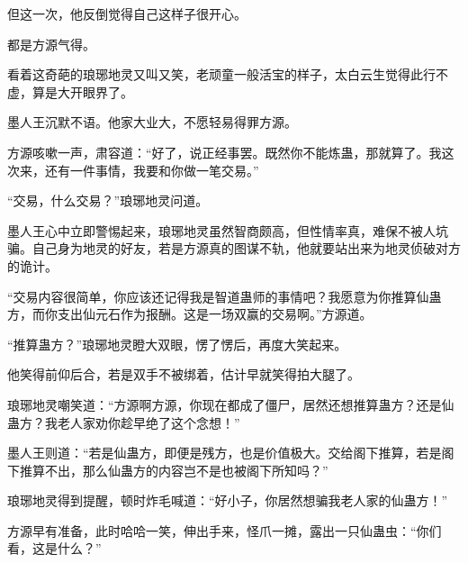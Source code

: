 \begin{this_body}
但这一次，他反倒觉得自己这样子很开心。

都是方源气得。

看着这奇葩的琅琊地灵又叫又笑，老顽童一般活宝的样子，太白云生觉得此行不虚，算是大开眼界了。

墨人王沉默不语。他家大业大，不愿轻易得罪方源。

方源咳嗽一声，肃容道：“好了，说正经事罢。既然你不能炼蛊，那就算了。我这次来，还有一件事情，我要和你做一笔交易。”

“交易，什么交易？”琅琊地灵问道。

墨人王心中立即警惕起来，琅琊地灵虽然智商颇高，但性情率真，难保不被人坑骗。自己身为地灵的好友，若是方源真的图谋不轨，他就要站出来为地灵侦破对方的诡计。

“交易内容很简单，你应该还记得我是智道蛊师的事情吧？我愿意为你推算仙蛊方，而你支出仙元石作为报酬。这是一场双赢的交易啊。”方源道。

“推算蛊方？”琅琊地灵瞪大双眼，愣了愣后，再度大笑起来。

他笑得前仰后合，若是双手不被绑着，估计早就笑得拍大腿了。

琅琊地灵嘲笑道：“方源啊方源，你现在都成了僵尸，居然还想推算蛊方？还是仙蛊方？我老人家劝你趁早绝了这个念想！”

墨人王则道：“若是仙蛊方，即便是残方，也是价值极大。交给阁下推算，若是阁下推算不出，那么仙蛊方的内容岂不是也被阁下所知吗？”

琅琊地灵得到提醒，顿时炸毛喊道：“好小子，你居然想骗我老人家的仙蛊方！”

方源早有准备，此时哈哈一笑，伸出手来，怪爪一摊，露出一只仙蛊虫：“你们看，这是什么？”

\end{this_body}

